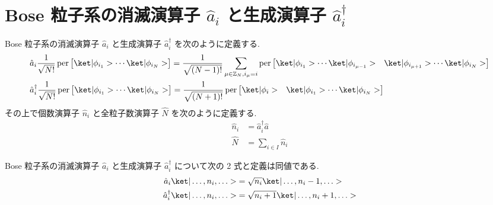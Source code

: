 \documentclass[uplatex,dvipdfmx,a4paper,11pt]{jlreq}
\DeclareMathOperator{\per}{per}
\newcommand{\ZZ}{\mathbb{Z}}
\numberwithin{equation}{section}
\theoremstyle{definition}
\begin{document}
\section{Bose 粒子系の消滅演算子 $\hat{a}_i$ と生成演算子 $\hat{a}_i^\dagger$}
\begin{definition}
  Bose 粒子系の消滅演算子 $\hat{a}_i$ と生成演算子 $\hat{a}_i^\dagger$ を次のように定義する.
  \begin{align}
     & \hat{a}_i\frac{1}{\sqrt{N!}}\per\begin{bmatrix}\ket|\phi_{i_1}> \cdots \ket|\phi_{i_N}>\end{bmatrix} = \frac{1}{\sqrt{(N-1)!}}\sum_{\mu\in\ZZ_N, i_\mu = i}\per\begin{bmatrix}\ket|\phi_{i_1}> \cdots \ket|\phi_{i_{\mu - 1}}> & \ket|\phi_{i_{\mu + 1}}> \cdots \ket|\phi_{i_N}>\end{bmatrix} \\
     & \hat{a}_i^\dagger\frac{1}{\sqrt{N!}}\per\begin{bmatrix}\ket|\phi_{i_1}> \cdots \ket|\phi_{i_N}>\end{bmatrix} = \frac{1}{\sqrt{(N+1)!}}\per\begin{bmatrix}\ket|\phi_{i}> & \ket|\phi_{i_1}> \cdots \ket|\phi_{i_N}>\end{bmatrix}
  \end{align}
  その上で個数演算子 $\hat{n}_i$ と全粒子数演算子 $\hat{N}$ を次のように定義する.
  \begin{align}
    \hat{n}_i & = \hat{a}_i^\dagger\hat{a} \\
    \hat{N}   & = \sum_{i\in I}\hat{n}_i
  \end{align}
\end{definition}
\begin{theorem}[Q21-35, Q21-36]
  Bose 粒子系の消滅演算子 $\hat{a}_i$ と生成演算子 $\hat{a}_i^\dagger$ について次の 2 式と定義は同値である.
  \begin{align}
    \hat{a}_i\ket|\ldots,n_i,\ldots>         & = \sqrt{n_i}\ket|\ldots,n_i-1,\ldots>   \\
    \hat{a}_i^\dagger\ket|\ldots,n_i,\ldots> & = \sqrt{n_i+1}\ket|\ldots,n_i+1,\ldots>
  \end{align}
  \label{Bose feature}
\end{theorem}
\end{document}
